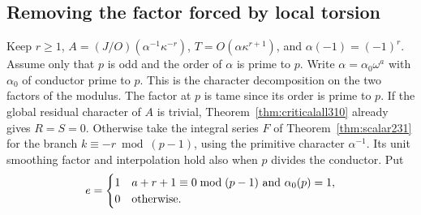 \documentclass[a4paper,11pt]{article}
\theoremstyle{definition}
\theoremstyle{remark}
\numberwithin{equation}{section}
\begin{document}
\subsection{Removing the factor forced by local torsion}\label{nav:IV-60}
Keep \(r\ge1\), \(A=(J/O)(\alpha^{-1}\kappa^{-r})\),
\(T=O(\alpha\kappa^{r+1})\), and \(\alpha(-1)=(-1)^r\).
Assume only that \(p\) is odd and the order of \(\alpha\) is
prime to \(p\). Write \(\alpha=\alpha_0\omega^a\) with
\(\alpha_0\) of conductor prime to \(p\). This is the character
decomposition on the two factors of the modulus. The factor at
\(p\) is tame since its order is prime to \(p\).
If the global residual character of \(A\) is trivial,
Theorem~\ref{thm:criticalall310} already gives \(R=S=0\).
Otherwise take the integral series \(F\) of Theorem~\ref{thm:scalar231}
for the branch \(k\equiv-r\bmod(p-1)\), using the primitive
character \(\alpha^{-1}\). Its unit smoothing factor and
interpolation hold also when \(p\) divides the conductor.
Put
\[
  e=\begin{cases}
  1 & a+r+1\equiv0\bmod(p-1)\ \hbox{and }\alpha_0(p)=1,\\
  0 & \hbox{otherwise.}
  \end{cases}
\]
\end{document}
